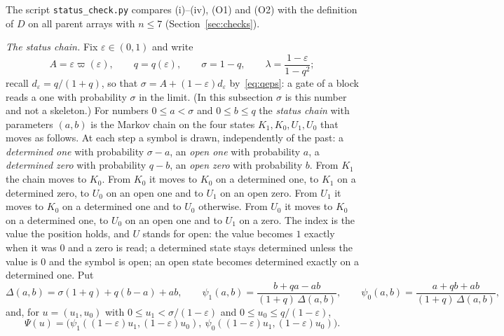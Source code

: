 \documentclass[11pt]{amsart}
\theoremstyle{definition}
\theoremstyle{remark}
\newcommand{\eps}{\varepsilon}
\begin{document}
\noindent The script \texttt{status\_check.py} compares (i)--(iv), (O1) and (O2) with the
definition of $D$ on all parent arrays with $n\le7$ (Section~\ref{sec:checks}).

\medskip\noindent\emph{The status chain.} Fix $\eps\in(0,1)$ and write
\[
A=\eps\varpi(\eps),\qquad q=q(\eps),\qquad\sigma=1-q,\qquad
\lambda=\frac{1-\eps}{1-q^2};
\]
recall $d_\eps=q/(1+q)$, so that $\sigma=A+(1-\eps)d_\eps$ by~\eqref{eq:qeps}: a gate of a block
reads a one with probability $\sigma$ in the limit. (In this subsection $\sigma$ is this number
and not a skeleton.) For numbers $0\le a<\sigma$ and $0\le b\le q$ the \emph{status chain} with
parameters $(a,b)$ is the Markov chain on the four states $K_1,K_0,U_1,U_0$ that moves as follows.
At each step a symbol is drawn, independently of the past: a \emph{determined one} with
probability $\sigma-a$, an \emph{open one} with probability $a$, a \emph{determined zero} with
probability $q-b$, an \emph{open zero} with probability $b$. From $K_1$ the chain moves to $K_0$.
From $K_0$ it moves to $K_0$ on a determined one, to $K_1$ on a determined zero, to $U_0$ on an
open one and to $U_1$ on an open zero. From $U_1$ it moves to $K_0$ on a determined one and to
$U_0$ otherwise. From $U_0$ it moves to $K_0$ on a determined one, to $U_0$ on an open one and to
$U_1$ on a zero. The index is the value the position holds, and $U$ stands for open: the value
becomes $1$ exactly when it was $0$ and a zero is read; a determined state stays determined unless
the value is $0$ and the symbol is open; an open state becomes determined exactly on a determined
one. Put
\[
\Delta(a,b)=\sigma(1+q)+q(b-a)+ab,\qquad
\psi_1(a,b)=\frac{b+qa-ab}{(1+q)\,\Delta(a,b)},\qquad
\psi_0(a,b)=\frac{a+qb+ab}{(1+q)\,\Delta(a,b)},
\]
and, for $u=(u_1,u_0)$ with $0\le u_1<\sigma/(1-\eps)$ and $0\le u_0\le q/(1-\eps)$,
\[
\Psi(u)=\bigl(\psi_1((1-\eps)u_1,(1-\eps)u_0),\ \psi_0((1-\eps)u_1,(1-\eps)u_0)\bigr).
\]
\end{document}
